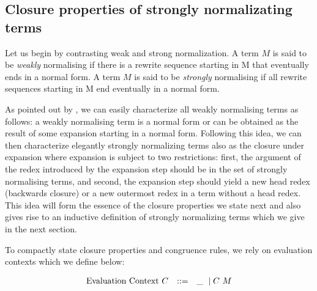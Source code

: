\documentclass{article}
\begin{document}
\subsection*{Closure properties of strongly normalizating terms}


Let us begin by contrasting weak and strong normalization. A term $M$ is said to be \emph{weakly} normalising if there is a  rewrite sequence starting in M that eventually ends in a  normal form. A  term $M$ is said to be \emph{strongly} normalising if all rewrite sequences starting in M end eventually in a  normal form.

As pointed out by \cite{Raamsdonk_onnormalisation}, we can easily characterize all weakly normalising terms as follows: a  weakly normalising term is a normal form or can be obtained as the result of some expansion starting in a  normal form. Following this idea, we can then characterize elegantly strongly normalizing terms also as the closure under expansion where expansion is subject to two restrictions: first, the argument of the redex introduced by the expansion step should be in the set of strongly normalising terms, and second, the expansion step should yield a new head redex (backwards closure) or a  new outermost redex in a  term without a  head redex. This idea will form the essence of the closure properties we state next and also gives rise to an inductive definition of strongly normalizing terms which we give in the next section.

To compactly state closure properties and congruence rules, we rely on evaluation contexts which we define below:

\[
\begin{array}{lcl}
\mbox{Evaluation Context}~C & \mathrel{::=} & {\_} ~\mid C~M
\end{array}
\]
\end{document}
